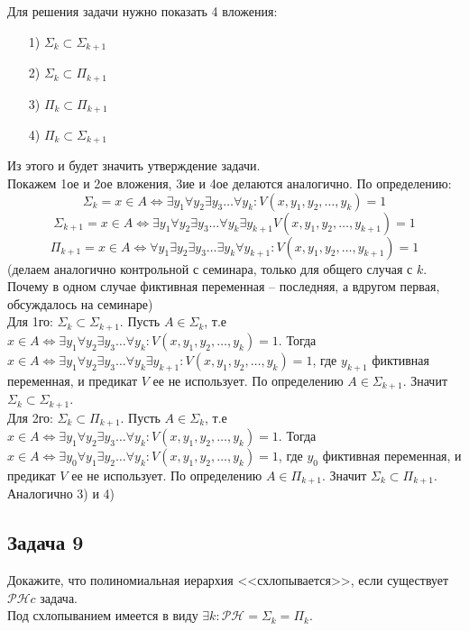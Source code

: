 \documentclass[a4paper,12pt]{article} %
\begin{document}
Для решения задачи нужно показать 4 вложения:
\begin{itemize}
\item[1)] $\Sigma_k \subset \Sigma_{k+1}$
\item[2)] $\Sigma_k \subset \Pi_{k+1}$
\item[3)] $\Pi_k \subset \Pi_{k+1}$
\item[4)] $\Pi_k \subset \Sigma_{k+1}$
\end{itemize}
Из этого и будет значить утверждение задачи.\\
Покажем 1ое и 2ое вложения, 3ие и 4ое делаются аналогично. По определению:
$$
\Sigma_k = x \in A \Leftrightarrow \exists y_{1} \forall y_{2} \exists y_{3} \ldots \forall y_k : V\left(x, y_{1}, y_{2}, \ldots, y_{k}\right)=1
$$
$$
\Sigma_{k+1} = x \in A \Leftrightarrow \exists y_{1} \forall y_{2} \exists y_{3} \ldots \forall y_k \exists y_{k+1} V\left(x, y_{1}, y_{2}, \ldots, y_{k+1}\right)=1
$$
$$
\Pi_{k+1} = x \in A \Leftrightarrow \forall y_{1} \exists y_{2} \exists y_{3} \ldots \exists y_k \forall y_{k+1} : V\left(x, y_{1}, y_{2}, \ldots, y_{k+1}\right)=1
$$
(делаем аналогично контрольной с семинара, только для общего случая с $ k $. Почему в одном случае фиктивная переменная -- последняя, а вдругом первая, обсуждалось на семинаре)\\
Для 1го: $\Sigma_k \subset \Sigma_{k+1}$. 
Пусть $A \in \Sigma_k$, т.е $x \in A \Leftrightarrow \exists y_{1} \forall y_{2} \exists y_{3} \ldots \forall y_k : V\left(x, y_{1}, y_{2}, \ldots, y_{k}\right)=1$. Тогда $x \in A \Leftrightarrow \exists y_{1} \forall y_{2} \exists y_{3} \ldots \forall y_k \exists y_{k+1} : V\left(x, y_{1}, y_{2}, \ldots, y_{k}\right)=1$, где $y_{k+1}$ фиктивная переменная, и предикат $V$ ее не использует. По определению $A \in \Sigma_{k+1}$. Значит $\Sigma_k \subset \Sigma_{k+1}$.\\

Для 2го: $\Sigma_k \subset \Pi_{k+1}$. Пусть $A \in \Sigma_k$, т.е $x \in A \Leftrightarrow \exists y_{1} \forall y_{2} \exists y_{3} \ldots \forall y_k : V\left(x, y_{1}, y_{2}, \ldots, y_{k}\right)=1$. Тогда $x \in A \Leftrightarrow \exists y_{0} \forall y_{1} \exists y_{2} \ldots \forall y_k : V\left(x, y_{1}, y_{2}, \ldots, y_{k}\right)=1$, где $y_0$ фиктивная переменная, и предикат $V$ ее не использует. По определению $A \in \Pi_{k+1}$. Значит $\Sigma_k \subset \Pi_{k+1}$.\\

Аналогично 3) и 4)
\subsection*{Задача 9}
Докажите, что полиномиальная иерархия <<схлопывается>>, если существует $\mathcal{PH}c$ задача. \\
Под схлопыванием имеется в виду $\exists k: \mathcal{PH} = \Sigma_k = \Pi_k$. \\
\end{document}
